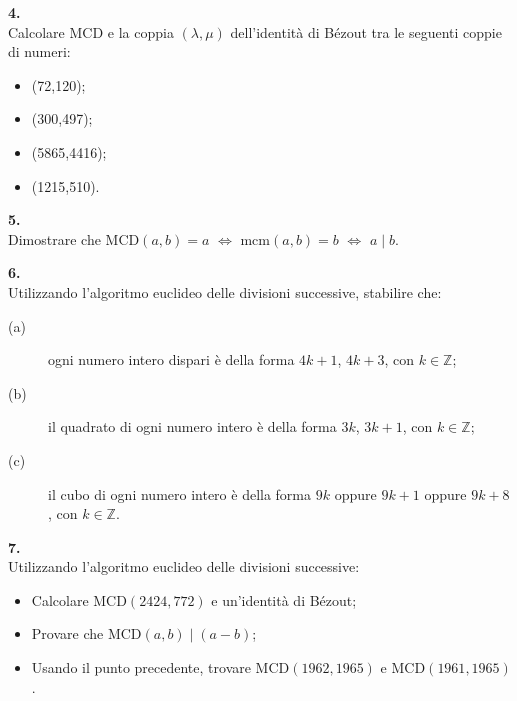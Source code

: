 \documentclass[italian,a4paper,11pt]
{article}
\newcommand{\Z}{\mathbb Z}
\newcommand{\Sse}{\Longleftrightarrow}
\begin{document}
\vspace{0.4cm}
\noindent
\begin{Ex}\textbf{ 4.}\\
Calcolare MCD e la coppia $(\lambda,\mu)$ dell'identit\`a di B\'ezout tra le seguenti coppie di numeri:
\begin{itemize}
	\item (72,120);
	\item (300,497);
	\item (5865,4416);
	\item (1215,510).
\end{itemize}
\end{Ex}

\vspace{0.4cm}
\noindent
\begin{Ex}\textbf{ 5.}\\
Dimostrare che MCD$(a,b)=a$ $\Sse$ mcm$(a,b)=b$ $\Sse$ $a\mid b$.
\end{Ex}

\vspace{0.4cm}
\noindent
\begin{Ex}\textbf{ 6.}\\
Utilizzando l'algoritmo euclideo delle divisioni successive, stabilire che:
\begin{description}
	\item [(a)] ogni numero intero dispari \`e della forma $4k + 1$, $4k + 3$, con $k\in \Z$;
	\item [(b)] il quadrato di ogni numero intero \`e della forma $3k$, $3k + 1$, con $k\in \Z$;
	\item [(c)] il cubo di ogni numero intero \`e della forma $9k$ oppure $9k + 1$ oppure $9k + 8$, con $k\in \Z$.
\end{description}
\end{Ex}

\vspace{0.4cm}
\noindent
\begin{Ex}\textbf{ 7.}\\
Utilizzando l'algoritmo euclideo delle divisioni successive:
\begin {itemize}
	\item Calcolare MCD$(2424,772)$ e un'identit\`a di B\'ezout;
	\item Provare che MCD$(a,b)\mid (a-b)$;
	\item Usando il punto precedente, trovare MCD$(1962,1965)$ e MCD$(1961,1965)$.
\end{itemize}
\end{Ex}
\end{document}
